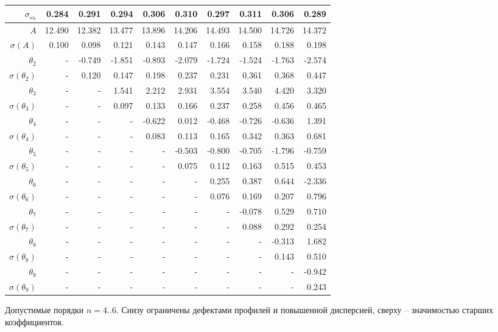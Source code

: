 \documentclass{matmex-diploma-custom}
\begin{document}
\begin{table}[h!!]
\begin{tabular}{r|rrr|rrr|rrr}
 $\sigma_{\omega_0} $& 0.284       &   0.291 &   0.294 &   0.306 &    0.310 &   0.297 &   0.311 &   0.306 &   0.289 \\\hline
 $A $&12.490      &  12.382 &  13.477 &  13.896 &  14.206 &  14.493 &    14.500 &  14.726 &  14.372 \\
 $\sigma(A) $ & 0.100       &   0.098 &   0.121 &   0.143 &   0.147 &   0.166 &   0.158 &   0.188 &   0.198 \\
 $\theta_2$&-        &  -0.749 &  -1.851 &  -0.893 &  -2.079 &  -1.724 &  -1.524 &  -1.763 &  -2.574 \\
 $\sigma(\theta_2)$&-      &    0.120 &   0.147 &   0.198 &   0.237 &   0.231 &   0.361 &   0.368 &   0.447 \\
 $\theta_3$&-      &    - &   1.541 &   2.212 &   2.931 &   3.554 &   3.540 &   4.420 &   3.320 \\
 $\sigma(\theta_3)$&-      &    - &   0.097 &   0.133 &   0.166 &   0.237 &   0.258 &   0.456 &   0.465 \\
 $\theta_4$&-      &    - &    - &  -0.622 &   0.012 &  -0.468 &  -0.726 &  -0.636 &   1.391 \\
 $\sigma(\theta_4)$&-      &    - &    - &     0.083 &   0.113 &   0.165 &   0.342 &   0.363 &   0.681 \\
 $\theta_5$&-      &    - &    - &    - &  -0.503 &  -0.800 &  -0.705 &  -1.796 &  -0.759 \\
 $\sigma(\theta_5)$&-      &    - &    - &    - &     0.075 &   0.112 &   0.163 &   0.515 &   0.453 \\
 $\theta_6$&-      &    - &    - &    - &    - &   0.255 &   0.387 &   0.644 &  -2.336 \\
 $\sigma(\theta_6)$&-    &    - &    - &    - &    - &   0.076 &   0.169 &   0.207 &   0.796 \\
 $\theta_7$&-     &    - &    - &    - &    - &    - &  -0.078 &   0.529 &   0.710 \\
 $ \sigma(\theta_7)$&-     &    - &    - &    - &    - &    - &      0.088 &   0.292 &   0.254 \\
 $\theta_8$&-     &    - &    - &    - &    - &    - &    - &   -0.313 &   1.682 \\
 $ \sigma(\theta_8)$&-     &    - &    - &    - &    - &    - &    - &     0.143 &   0.510 \\
 $\theta_9$&-     &    - &    - &    - &    - &    - &    - &    - &  -0.942  \\
 $ \sigma(\theta_9)$&-     &    - &    - &    - &    - &    - &    - &    - &   0.243  \\
\end{tabular}
\end{table}
Допустимые порядки $n=4..6$. Снизу ограничены дефектами профилей и повышенной дисперсией, сверху -- значимостью старших коэффициентов.
\end{document}

